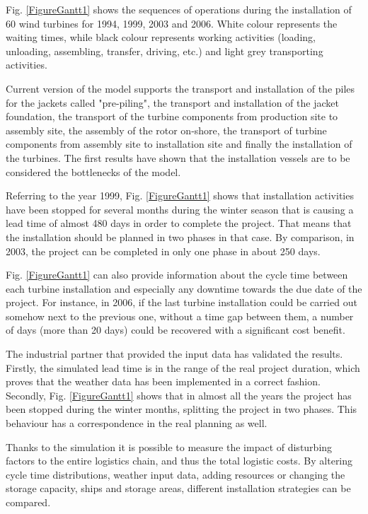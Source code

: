 Fig. \ref{FigureGantt1} shows the sequences of operations during the installation of 60 wind turbines for 1994, 1999, 2003 and 2006. White colour represents the waiting times, while black colour represents working activities (loading, unloading, assembling, transfer, driving, etc.) and light grey transporting activities. 

Current version of the model supports the transport and installation of the piles for the jackets called "pre-piling", the transport and installation of the jacket foundation, the transport of the turbine components from production site to assembly site, the assembly of the rotor on-shore, the transport of turbine components from assembly site to installation site and finally the installation of the turbines. The first results have shown that the installation vessels are to be considered the bottlenecks of the model.

Referring to the year 1999, Fig. \ref{FigureGantt1} shows that installation activities have been stopped for several months during the winter season that is causing a lead time of almost 480 days in order to complete the project. That means that the installation should be planned in two phases in that case. By comparison, in 2003, the project can be completed in only one phase in about 250 days.

Fig. \ref{FigureGantt1} can also provide information about the cycle time between each turbine installation and especially any downtime towards the due date of the project. For instance, in 2006, if the last turbine installation could be carried out somehow next to the previous one, without a time gap between them, a number of days (more than 20 days) could be recovered with a significant cost benefit.

The industrial partner that provided the input data has validated the results. Firstly, the simulated lead time is in the range of the real project duration, which proves that the weather data has been implemented in a correct fashion. 
Secondly, Fig. \ref{FigureGantt1} shows that in almost all the years the project has been stopped during the winter months, splitting the project in two phases. This behaviour has a correspondence in the real planning as well.

Thanks to the simulation it is possible to measure the impact of disturbing factors to the entire logistics chain, and thus the total logistic costs. By altering cycle time distributions, weather input data, adding resources or changing the storage capacity, ships and storage areas, different installation strategies can be compared.


